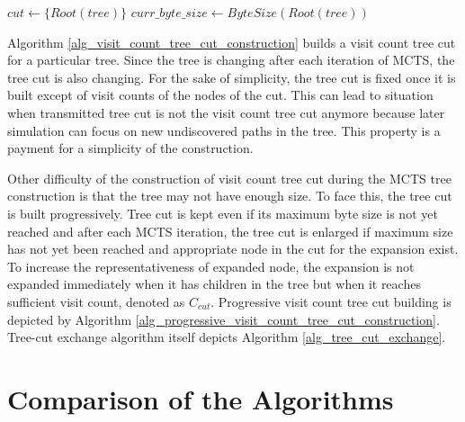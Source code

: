 \begin{algorithm}
\DontPrintSemicolon
\caption{$BuildVisitCountTreeCut(tree,byte\_size)$\label{alg_visit_count_tree_cut_construction}}
$cut \leftarrow \{Root(tree)\}$ \;
$curr\_byte\_size \leftarrow ByteSize(Root(tree))$\;
\end{algorithm}

Algorithm \ref{alg_visit_count_tree_cut_construction} builds a visit count tree cut for a
particular tree. Since the tree is changing after each iteration of MCTS, the tree cut is also
changing. For the sake of simplicity, the tree cut is fixed once it is built except of visit
counts of the nodes of the cut. This can lead to situation when transmitted tree cut is not the
visit count tree cut anymore because later simulation can focus on new undiscovered paths in
the tree. This property is a payment for a simplicity of the construction.

Other difficulty of the construction of visit count tree cut during the MCTS tree construction
is that the tree may not have enough size. To face this, the tree cut is built progressively.
Tree cut is kept even if its maximum byte size is not yet reached and after each MCTS
iteration, the tree cut is enlarged if maximum size has not yet been reached and appropriate
node in the cut for the expansion exist. To increase the representativeness of expanded node,
the expansion is not expanded immediately when it has children in the tree but when it reaches
sufficient visit count, denoted as $C_{cut}$. Progressive visit count tree cut building is
depicted by Algorithm \ref{alg_progressive_visit_count_tree_cut_construction}. Tree-cut
exchange algorithm itself depicts Algorithm \ref{alg_tree_cut_exchange}.


\section{Comparison of the Algorithms}
\label{sec_dmcts_comparison}
